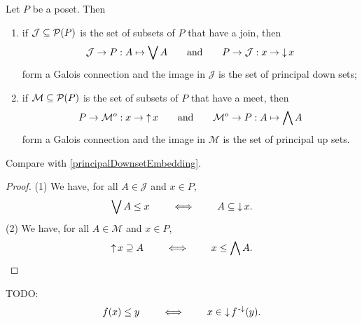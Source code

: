 \begin{proposition} \label{upsetDownsetConnections}
Let $P$ be a poset. Then
\begin{enumerate}
\item if $\mathcal{J}\subseteq \operatorname{\mathcal{P}}(P)$ is the set of subsets of $P$ that have a join, then
\[ \mathcal{J} \to P: A\mapsto \bigvee A \qquad\text{and}\qquad P\to \mathcal{J}: x\to \operatorname{\downarrow} x \]
form a Galois connection and the image in $\mathcal{J}$ is the set of principal down sets;
\item if $\mathcal{M}\subseteq \operatorname{\mathcal{P}}(P)$ is the set of subsets of $P$ that have a meet, then
\[ P\to \mathcal{M}^o: x\to \operatorname{\uparrow} x \qquad\text{and}\qquad \mathcal{M}^o \to P: A\mapsto \bigwedge A \]
form a Galois connection and the image in $\mathcal{M}$ is the set of principal up sets. 
\end{enumerate}
\end{proposition}
Compare with \ref{principalDownsetEmbedding}.
\begin{proof}
(1) We have, for all $A\in \mathcal{J}$ and $x\in P$,
\[ \bigvee A \leq x \qquad \iff\qquad A\subseteq \operatorname{\downarrow} x. \]
(2) We have, for all $A\in \mathcal{M}$ and $x\in P$,
\[ \operatorname{\uparrow} x \supseteq A \qquad \iff\qquad x\leq \bigwedge A. \]
\end{proof}

TODO:
\[ f(x) \leq y \qquad\iff\qquad x\in \operatorname{\downarrow} f^{{\text{\hspace{0.15em}-}\downarrow}}(y). \]

